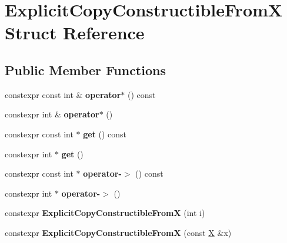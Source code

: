 \hypertarget{struct_explicit_copy_constructible_from_x}{}\section{Explicit\+Copy\+Constructible\+FromX Struct Reference}
\label{struct_explicit_copy_constructible_from_x}
\subsection*{Public Member Functions}
\begin{DoxyCompactItemize}
\item 
\mbox{\label{struct_explicit_copy_constructible_from_x_a8c026aff4a83e0db6212ae0a2dfa022d}} 
constexpr const int \& {\bfseries operator$\ast$} () const
\item 
\mbox{\label{struct_explicit_copy_constructible_from_x_a56c021e926bbf0c132114334b5f5eb8c}} 
constexpr int \& {\bfseries operator$\ast$} ()
\item 
\mbox{\label{struct_explicit_copy_constructible_from_x_a2b70d67d793c39e12ff21f2d1b623062}} 
constexpr const int $\ast$ {\bfseries get} () const
\item 
\mbox{\label{struct_explicit_copy_constructible_from_x_a7f681c8f43d86c3502172b90a74f35f2}} 
constexpr int $\ast$ {\bfseries get} ()
\item 
\mbox{\label{struct_explicit_copy_constructible_from_x_aa1882c25827ca1ef9accd10913f736b2}} 
constexpr const int $\ast$ {\bfseries operator-\/$>$} () const
\item 
\mbox{\label{struct_explicit_copy_constructible_from_x_a25425d8107f8fbe67e10b5bdd8716d6c}} 
constexpr int $\ast$ {\bfseries operator-\/$>$} ()
\item 
\mbox{\label{struct_explicit_copy_constructible_from_x_ae9e9cdccae33fb4d21d2a173562665df}} 
constexpr {\bfseries Explicit\+Copy\+Constructible\+FromX} (int i)
\item 
\mbox{\label{struct_explicit_copy_constructible_from_x_ac4ce799a3a4388abd72606aab511d073}} 
constexpr {\bfseries Explicit\+Copy\+Constructible\+FromX} (const \mbox{\hyperlink{class_x}{X}} \&x)
\end{DoxyCompactItemize}
